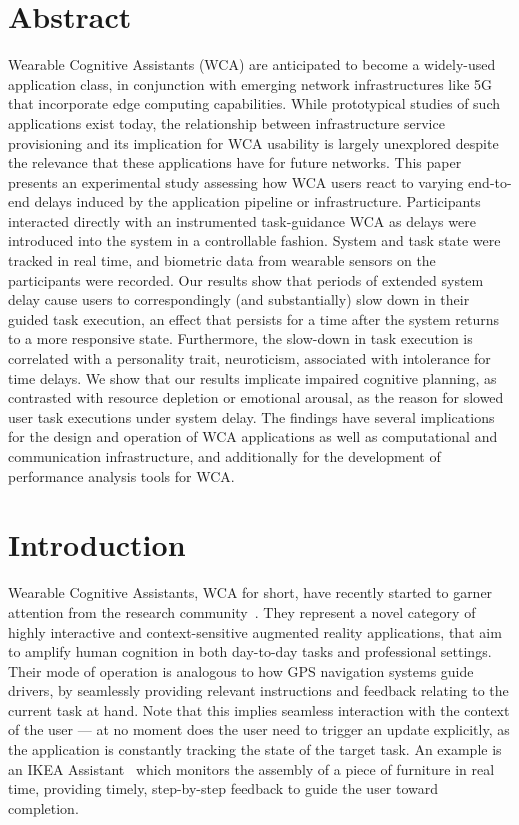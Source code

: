 \section*{Abstract}

Wearable Cognitive Assistants (WCA) are anticipated to become a widely-used application class, in conjunction with emerging network infrastructures like 5G that incorporate edge computing capabilities.
While prototypical studies of such applications exist today, the relationship between infrastructure service provisioning and its implication for WCA usability is largely unexplored despite the relevance that these applications have for future networks.
This paper presents an experimental study assessing how WCA users react to varying end-to-end delays induced by the application pipeline or infrastructure.
Participants interacted directly with an instrumented task-guidance WCA as delays were introduced into the system in a controllable fashion.
System and task state were tracked in real time, and biometric data from wearable sensors on the participants were recorded.
Our results show that periods of extended system delay cause users to correspondingly (and substantially) slow down in their guided task execution, an effect that persists for a time after the system returns to a more responsive state.
Furthermore, the slow-down in task execution is correlated with a personality trait, neuroticism, associated with intolerance for time delays.
We show that our results implicate impaired cognitive planning, as contrasted with resource depletion or emotional arousal, as the reason for slowed user task executions under system delay.
The findings have several implications for the design and operation of WCA applications as well as computational and communication infrastructure, and additionally for the development of performance analysis tools for WCA.\@

\section{Introduction}

Wearable Cognitive Assistants, WCA for short, have recently started to garner attention from the research community~\cite{Ha:TowardsWearableCogAssist,Chen:EarlyImplementation}.
They represent a novel category of highly interactive and context-sensitive augmented reality applications, that aim to amplify human cognition in both day-to-day tasks and professional settings.
Their mode of operation is analogous to how GPS navigation systems guide drivers, by seamlessly providing relevant instructions and feedback relating to the current task at hand.
Note that this implies seamless interaction with the context of the user --- at no moment does the user need to trigger an update explicitly, as the application is constantly tracking the state of the target task.
An example is an IKEA Assistant~\cite{IKEAAssistant} which monitors the assembly of a piece of furniture in real time, providing timely, step-by-step feedback to guide the user toward completion.

